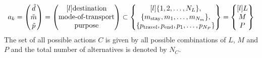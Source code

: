 \begin{equation} 
    a_k = \begin{pmatrix}
    \act{d} \\
    \act{m} \\
    \act{p}    
    \end{pmatrix} =
    \begin{pmatrix*}[l]
    \text{destination} \\
    \text{mode-of-transport} \\
    \text{purpose} \\
    \end{pmatrix*} 
    \subset
    \begin{Bmatrix*}[l]
    \{1,2,\dots, N_L\}, \\
    \{m_{\text{stay}},m_1,\dots,m_{N_m}\}, \\
    \{p_{\text{travel}},p_{\text{end}},p_1,\dots,p_{N_P}\} 
    \end{Bmatrix*}=
    \begin{Bmatrix*}[l]
    L \\
    M \\
    P \\
    \end{Bmatrix*}
\end{equation}
The set of all possible actions $C$ is given by all possible combinations of $L$, $M$ and $P$ and the total number of alternatives is denoted by
$N_C$.
